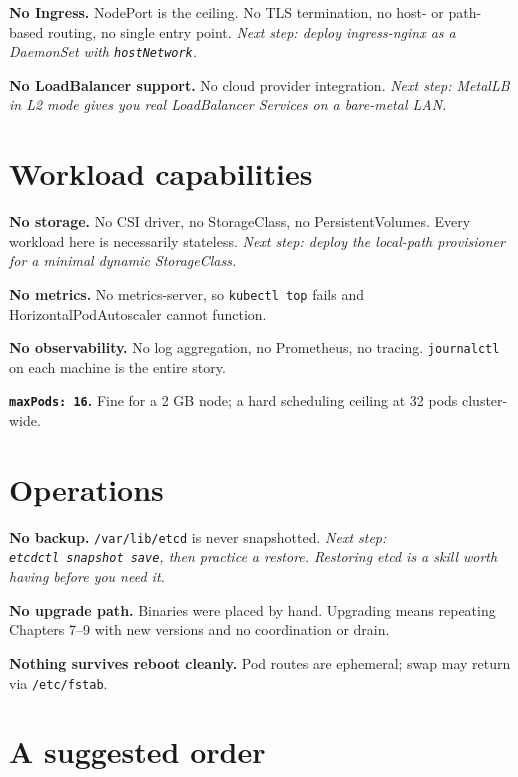 \documentclass[11pt,oneside]{report}
\begin{document}
\textbf{No Ingress.}
NodePort is the
ceiling. No TLS
termination, no
host- or path-based
routing, no single
entry point.
\emph{Next step:
deploy ingress-nginx
as a DaemonSet with
\texttt{hostNetwork}.}

\textbf{No
LoadBalancer
support.} No cloud
provider
integration.
\emph{Next step:
MetalLB in L2 mode
gives you real
LoadBalancer
Services on a
bare-metal LAN.}

\hypertarget{workload-capabilities}{%
\section{Workload
capabilities}\label{workload-capabilities}}

\textbf{No storage.}
No CSI driver, no
StorageClass, no
PersistentVolumes.
Every workload here
is necessarily
stateless.
\emph{Next step:
deploy the
local-path
provisioner for a
minimal dynamic
StorageClass.}

\textbf{No metrics.}
No metrics-server,
so
\texttt{kubectl\ top}
fails and
HorizontalPodAutoscaler
cannot function.

\textbf{No
observability.} No
log aggregation, no
Prometheus, no
tracing.
\texttt{journalctl}
on each machine is
the entire story.

\textbf{\texttt{maxPods:\ 16}.}
Fine for a 2 GB
node; a hard
scheduling ceiling
at 32 pods
cluster-wide.

\hypertarget{operations}{%
\section{Operations}\label{operations}}

\textbf{No backup.}
\texttt{/var/lib/etcd}
is never
snapshotted.
\emph{Next step:
\texttt{etcdctl\ snapshot\ save},
then practice a
restore. Restoring
etcd is a skill
worth having before
you need it.}

\textbf{No upgrade
path.} Binaries were
placed by hand.
Upgrading means
repeating Chapters
7--9 with new
versions and no
coordination or
drain.

\textbf{Nothing
survives reboot
cleanly.} Pod routes
are ephemeral; swap
may return via
\texttt{/etc/fstab}.

\hypertarget{a-suggested-order}{%
\section{A suggested
order}\label{a-suggested-order}}
\end{document}
